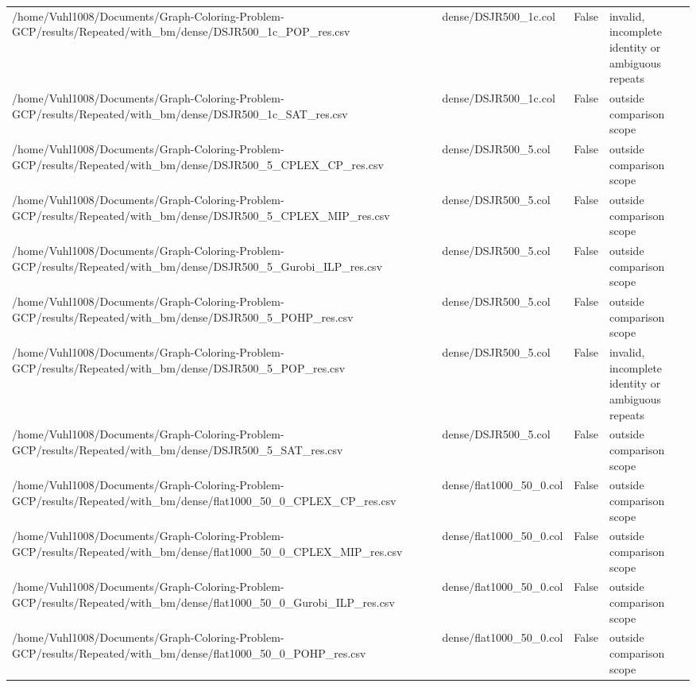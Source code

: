 \begin{table}[htbp]
\begin{tabular}{llll}
/home/Vuhl1008/Documents/Graph-Coloring-Problem-GCP/results/Repeated/with\_bm/dense/DSJR500\_1c\_POP\_res.csv & dense/DSJR500\_1c.col & False & invalid, incomplete identity or ambiguous repeats \\
/home/Vuhl1008/Documents/Graph-Coloring-Problem-GCP/results/Repeated/with\_bm/dense/DSJR500\_1c\_SAT\_res.csv & dense/DSJR500\_1c.col & False & outside comparison scope \\
/home/Vuhl1008/Documents/Graph-Coloring-Problem-GCP/results/Repeated/with\_bm/dense/DSJR500\_5\_CPLEX\_CP\_res.csv & dense/DSJR500\_5.col & False & outside comparison scope \\
/home/Vuhl1008/Documents/Graph-Coloring-Problem-GCP/results/Repeated/with\_bm/dense/DSJR500\_5\_CPLEX\_MIP\_res.csv & dense/DSJR500\_5.col & False & outside comparison scope \\
/home/Vuhl1008/Documents/Graph-Coloring-Problem-GCP/results/Repeated/with\_bm/dense/DSJR500\_5\_Gurobi\_ILP\_res.csv & dense/DSJR500\_5.col & False & outside comparison scope \\
/home/Vuhl1008/Documents/Graph-Coloring-Problem-GCP/results/Repeated/with\_bm/dense/DSJR500\_5\_POHP\_res.csv & dense/DSJR500\_5.col & False & outside comparison scope \\
/home/Vuhl1008/Documents/Graph-Coloring-Problem-GCP/results/Repeated/with\_bm/dense/DSJR500\_5\_POP\_res.csv & dense/DSJR500\_5.col & False & invalid, incomplete identity or ambiguous repeats \\
/home/Vuhl1008/Documents/Graph-Coloring-Problem-GCP/results/Repeated/with\_bm/dense/DSJR500\_5\_SAT\_res.csv & dense/DSJR500\_5.col & False & outside comparison scope \\
/home/Vuhl1008/Documents/Graph-Coloring-Problem-GCP/results/Repeated/with\_bm/dense/flat1000\_50\_0\_CPLEX\_CP\_res.csv & dense/flat1000\_50\_0.col & False & outside comparison scope \\
/home/Vuhl1008/Documents/Graph-Coloring-Problem-GCP/results/Repeated/with\_bm/dense/flat1000\_50\_0\_CPLEX\_MIP\_res.csv & dense/flat1000\_50\_0.col & False & outside comparison scope \\
/home/Vuhl1008/Documents/Graph-Coloring-Problem-GCP/results/Repeated/with\_bm/dense/flat1000\_50\_0\_Gurobi\_ILP\_res.csv & dense/flat1000\_50\_0.col & False & outside comparison scope \\
/home/Vuhl1008/Documents/Graph-Coloring-Problem-GCP/results/Repeated/with\_bm/dense/flat1000\_50\_0\_POHP\_res.csv & dense/flat1000\_50\_0.col & False & outside comparison scope \\

\end{tabular}
\end{table}
